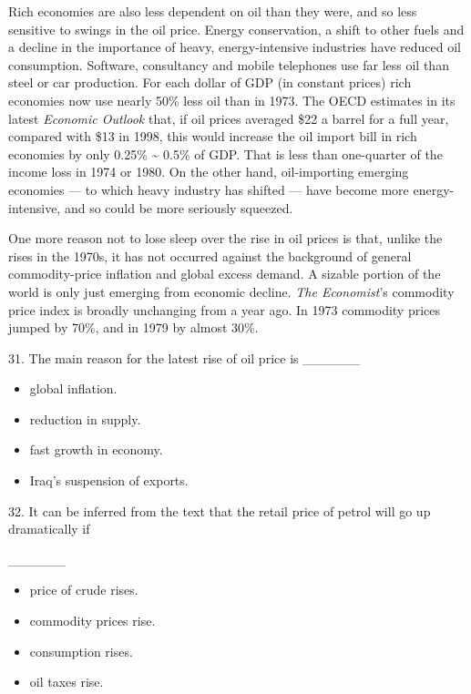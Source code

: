 \documentclass[UTF8,11pt]{ctexart}
\begin{document}
Rich economies are also less dependent on oil than they were, and so less sensitive to swings in the oil price. Energy conservation, a shift to other fuels and a decline in the importance of heavy, energy-intensive industries have reduced oil consumption. Software, consultancy and mobile telephones use far less oil than steel or car production. For each dollar of GDP (in constant prices) rich economies now use nearly 50\% less oil than in 1973. The OECD estimates in its latest \textit{Economic Outlook} that, if oil prices averaged \$22 a barrel for a full year, compared with \$13 in 1998, this would increase the oil import bill in rich economies by only 0.25\% \textasciitilde{} 0.5\% of GDP. That is less than one-quarter of the income loss in 1974 or 1980. On the other hand, oil-importing emerging economies — to which heavy industry has shifted — have become more energy-intensive, and so could be more seriously squeezed.


One more reason not to lose sleep over the rise in oil prices is that, unlike the rises in the 1970s, it has not occurred against the background of general commodity-price inflation and global excess demand. A sizable portion of the world is only just emerging from economic decline. \textit{The Economist}’s commodity price index is broadly unchanging from a year ago. In 1973 commodity prices jumped by 70\%, and in 1979 by almost 30\%.


31. The main reason for the latest rise of oil price is \_\_\_\_\_\_


\begin{itemize}[leftmargin=2em,itemsep=.2em,topsep=.4em]\item[A.] global inflation.
\item[B.] reduction in supply.
\item[C.] fast growth in economy.
\item[D.] Iraq’s suspension of exports.
\end{itemize}

32. It can be inferred from the text that the retail price of petrol will go up dramatically if


\_\_\_\_\_\_


\begin{itemize}[leftmargin=2em,itemsep=.2em,topsep=.4em]\item[A.] price of crude rises.
\item[B.] commodity prices rise.
\item[C.] consumption rises.
\item[D.] oil taxes rise.
\end{itemize}
\end{document}
